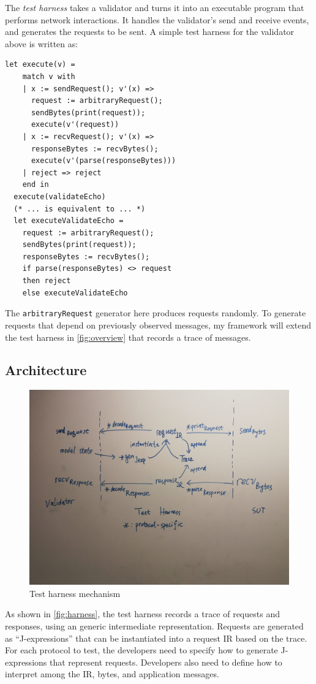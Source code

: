 \documentclass{article}
\newcommand{\ilc}[1]{\lstinline[style=customcoq]{#1}}
\theoremstyle{definition}
\begin{document}
The {\em test harness} takes a validator and turns it into an executable program
that performs network interactions.  It handles the validator's send and receive
events, and generates the requests to be sent.  A simple test harness for the
validator above is written as:
\begin{lstlisting}[style=customcoq]
  let execute(v) =
    match v with
    | x := sendRequest(); v'(x) =>
      request := arbitraryRequest();
      sendBytes(print(request));
      execute(v'(request))
    | x := recvRequest(); v'(x) =>
      responseBytes := recvBytes();
      execute(v'(parse(responseBytes)))
    | reject => reject
    end in
  execute(validateEcho)
  (* ... is equivalent to ... *)
  let executeValidateEcho =
    request := arbitraryRequest();
    sendBytes(print(request));
    responseBytes := recvBytes();
    if parse(responseBytes) <> request
    then reject
    else executeValidateEcho
\end{lstlisting}

The \ilc{arbitraryRequest} generator here produces requests randomly.  To
generate requests that depend on previously observed messages, my framework will
extend the test harness in \autoref{fig:overview} that records a trace of
messages.

\subsection{Architecture}
\begin{figure}
  \centering
  \includegraphics[width=.8\textwidth]{figures/harness}
  \caption{Test harness mechanism}
  \label{fig:harness}
\end{figure}

As shown in \autoref{fig:harness}, the test harness records a trace of requests
and responses, using an generic intermediate representation.  Requests are
generated as ``J-expressions'' that can be instantiated into a request IR based
on the trace.  For each protocol to test, the developers need to specify how to
generate J-expressions that represent requests.  Developers also need to define
how to interpret among the IR, bytes, and application messages.
\end{document}
